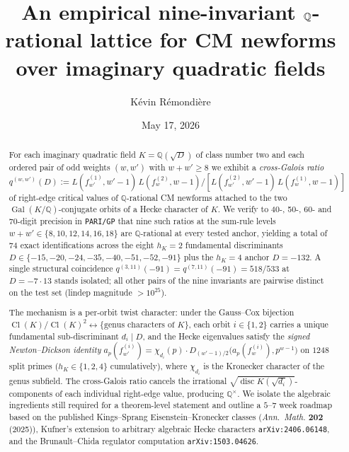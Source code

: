 \documentclass[11pt,a4paper]{amsart}
\title[A nine-invariant lattice for CM newforms]{An empirical nine-invariant
$\Q$-rational lattice for CM newforms over imaginary quadratic fields}
\author{K\'evin R\'emondi\`ere}
\date{May 17, 2026}
\theoremstyle{plain}
\theoremstyle{definition}
\DeclareMathOperator{\Cl}{Cl}
\DeclareMathOperator{\Gal}{Gal}
\DeclareMathOperator{\disc}{disc}
\newcommand{\Q}{\mathbb{Q}}
\newcommand{\fl}[2]{f_{#1}^{(#2)}}
\newcommand{\qstr}[2]{q^{(#1,#2)}}
\begin{document}
\begin{abstract}
For each imaginary quadratic field $K = \Q(\sqrt{D})$ of class number two
and each ordered pair of odd weights $(w,w')$ with $w+w' \ge 8$ we exhibit a
\emph{cross-Galois ratio}
$\qstr{w}{w'}(D) := L(f_{w'}^{(1)}, w'-1)\,L(f_w^{(2)}, w-1)/[L(f_{w'}^{(2)},
w'-1)\,L(f_w^{(1)}, w-1)]$
of right-edge critical values of $\Q$-rational CM newforms attached to the
two $\Gal(K/\Q)$-conjugate orbits of a Hecke character of $K$. We verify
to 40-, 50-, 60- and 70-digit precision in \texttt{PARI/GP} that nine such
ratios at the sum-rule levels $w+w' \in \{8, 10, 12, 14, 16, 18\}$ are
$\Q$-rational at every tested anchor, yielding a total of
$74$ exact identifications across the eight $h_K = 2$ fundamental
discriminants $D \in \{-15,-20,-24,-35,-40,-51,-52,-91\}$
plus the $h_K = 4$ anchor $D = -132$. A single structural coincidence
$\qstr{3}{11}(-91) = \qstr{7}{11}(-91) = 518/533$ at $D = -7\cdot 13$ stands
isolated; all other pairs of the nine invariants are pairwise distinct on
the test set (lindep magnitude $> 10^{25}$).

The mechanism is a per-orbit twist character: under the
Gauss--Cox bijection $\Cl(K)/\Cl(K)^2 \leftrightarrow \{\text{genus
characters of } K\}$, each orbit $i\in\{1,2\}$ carries a unique fundamental
sub-discriminant $d_i \mid D$, and the Hecke eigenvalues satisfy the
\emph{signed Newton--Dickson identity}
$a_p(\fl{w'}{i}) = \chi_{d_i}(p)\cdot D_{(w'-1)/2}\bigl(a_p(\fl{w}{i}), p^{w-1}
\bigr)$
on $1248$ split primes ($h_K \in \{1,2,4\}$ cumulatively), where
$\chi_{d_i}$ is the Kronecker character of the genus subfield. The cross-Galois
ratio cancels the irrational
$\sqrt{\disc K(\sqrt{d_i})}$-components of each individual right-edge value,
producing $\Q^{\times}$. We isolate the algebraic ingredients still required
for a theorem-level statement and outline a $5$--$7$ week roadmap based on
the published Kings--Sprang Eisenstein--Kronecker classes (\emph{Ann.~Math.}
$\mathbf{202}$ (2025)), Kufner's extension to arbitrary algebraic Hecke
characters \texttt{arXiv:2406.06148}, and the Brunault--Chida regulator
computation \texttt{arXiv:1503.04626}.
\end{abstract}

\maketitle

\setcounter{tocdepth}{2}
\tableofcontents

\end{document}

